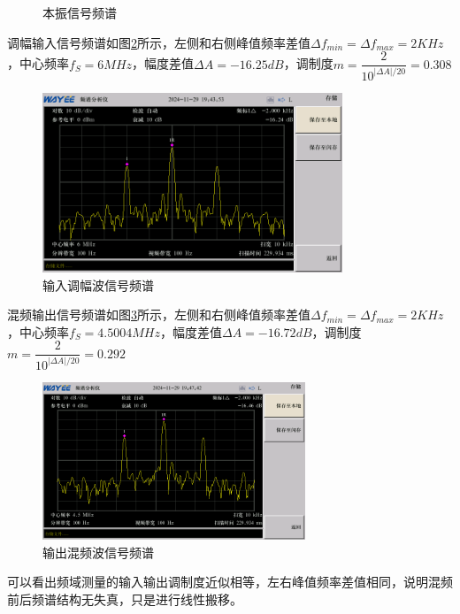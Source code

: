\documentclass[UTF8]{ctexart}
\begin{document}
\begin{enumerate}
\begin{figure}[H]
        \caption{本振信号频谱}\label{fig:34}
    \end{figure}
    \vspace{-1em}
    调幅输入信号频谱如图\ref{fig:35}所示，左侧和右侧峰值频率差值$\Delta f_{min}=\Delta f_{max}=2KHz$，中心频率$f_S=6MHz$，幅度差值$\Delta A=-16.25dB$，调制度$m=\dfrac{2}{10^{\left\lvert \Delta A\right\rvert /20}}=0.308$
    \begin{figure}[H]
        \centering
        \includegraphics[width=0.8\textwidth]{pics/35.png}

        \caption{输入调幅波信号频谱}\label{fig:35}
    \end{figure}
    \vspace{-1em}
    混频输出信号频谱如图\ref{fig:36}所示，左侧和右侧峰值频率差值$\Delta f_{min}=\Delta f_{max}=2KHz$，中心频率$f_S=4.5004MHz$，幅度差值$\Delta A=-16.72dB$，调制度$m=\dfrac{2}{10^{\left\lvert \Delta A\right\rvert /20}}=0.292$
    \begin{figure}[H]
        \centering
        \includegraphics[width=0.7\textwidth]{pics/36.png}

        \caption{输出混频波信号频谱}\label{fig:36}
    \end{figure}
    \vspace{-2em}
    可以看出频域测量的输入输出调制度近似相等，左右峰值频率差值相同，说明混频前后频谱结构无失真，只是进行线性搬移。

\end{enumerate}
\end{document}
